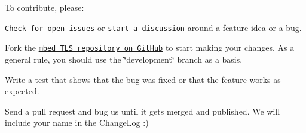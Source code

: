 To contribute, please\-:
\begin{DoxyItemize}
\item \href{https://github.com/ARMmbed/mbedtls/issues}{\tt Check for open issues} or \href{https://tls.mbed.org/discussions}{\tt start a discussion} around a feature idea or a bug.
\item Fork the \href{https://github.com/ARMmbed/mbedtls}{\tt mbed T\-L\-S repository on Git\-Hub} to start making your changes. As a general rule, you should use the \char`\"{}development\char`\"{} branch as a basis.
\item Write a test that shows that the bug was fixed or that the feature works as expected.
\item Send a pull request and bug us until it gets merged and published. We will include your name in the Change\-Log \-:) 
\end{DoxyItemize}